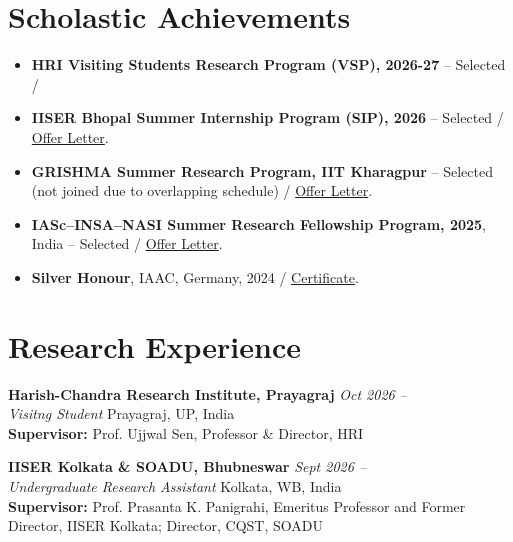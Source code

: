 \documentclass[11pt,a4paper]{article}
\newcommand{\entry}[4]{
    \textbf{#1} \hfill \textit{#2}\\
    \textit{#3} \hfill #4
    \vspace{3pt}
}
\begin{document}
\section{Scholastic Achievements}

\begin{itemize}
    \item \textbf{HRI Visiting Students Research Program (VSP), 2026-27}
    -- Selected / 
    \item \textbf{IISER Bhopal Summer Internship Program (SIP), 2026}
    -- Selected / \href{https://drive.google.com/file/d/19KI8KwJgoWlNMxhyr6JmX6We5U1eYqXy/view}{Offer Letter}.

    \item \textbf{GRISHMA Summer Research Program, IIT Kharagpur}
    -- Selected (not joined due to overlapping schedule) / \href{https://drive.google.com/file/d/15TsCT1BaY7Ln1zuf8dIu2j2J3oRW39ya/view}{Offer Letter}.

    \item \textbf{IASc--INSA--NASI Summer Research Fellowship Program,
    2025}, India -- Selected / \href{https://drive.google.com/file/d/1c7MNgjkSZGNMjPqBJrUiEm1o9r3ER1DS/view}{Offer Letter}.

    \item \textbf{Silver Honour}, IAAC, Germany, 2024 / \href{https://drive.google.com/file/d/1Qcdn53l4dRz0xNyGqWUqF-QKqerZJ1hD/view}{Certificate}.

\end{itemize}



\section{Research Experience}

\entry
{Harish-Chandra Research Institute, Prayagraj}
{Oct 2026 --}
{Visitng Student}
{Prayagraj, UP, India}\\
\textbf{Supervisor:} Prof. Ujjwal Sen, Professor \& Director, HRI


\vspace{0.5cm}

\entry
{IISER Kolkata \& SOADU, Bhubneswar}
{Sept 2026 --}
{Undergraduate Research Assistant}
{Kolkata, WB, India}\\
\textbf{Supervisor:} Prof. Prasanta K. Panigrahi, Emeritus Professor and Former Director, IISER Kolkata; Director, CQST, SOADU
\end{document}
